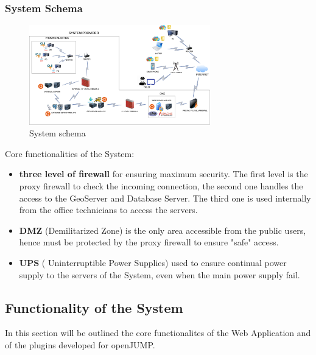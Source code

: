 \subsubsection{System Schema}

     \begin{figure}[h]
        \centering
        \includegraphics[width=0.7\textwidth]{images/system.png}
        \caption{System schema}
        \label{fig:yourlabel}
       \end{figure}


 Core functionalities of the System:
 \begin{itemize}
     \item \textbf{three level of firewall} for ensuring maximum security. The first level is the proxy firewall to check the incoming connection, the second one handles the access to the GeoServer and Database Server.
     The third one is used internally from the office technicians to access the servers.
     \item \textbf{DMZ} (Demilitarized Zone) is the only area accessible from the public users, hence must be protected by the proxy firewall to ensure "safe" access.
     \item \textbf{UPS} ( Uninterruptible Power Supplies) used to ensure continual power supply to the servers of the System, even when the main power supply fail.
 \end{itemize}

 \subsection{Functionality of the System}
 In this section will be outlined the core functionalites of the Web Application and of the plugins developed for openJUMP.

